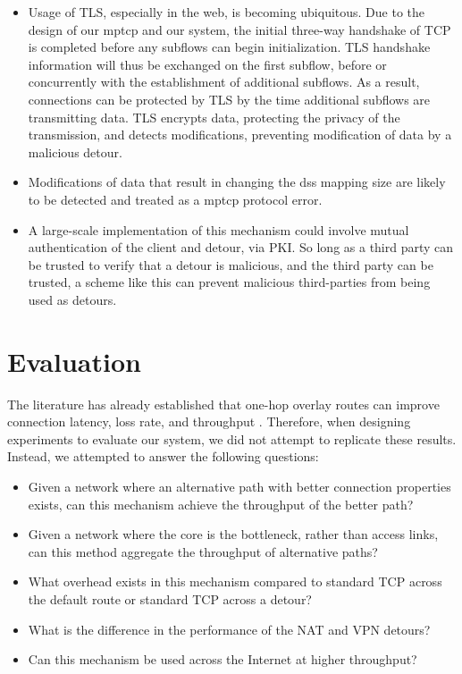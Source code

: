 \documentclass{cwru}
\begin{document}
\begin{itemize}
\item Usage of TLS, especially in the web, is becoming ubiquitous. Due to the
  design of our \ac{mptcp} and our system, the initial three-way handshake of
  TCP is completed before any subflows can begin initialization. TLS handshake
  information will thus be exchanged on the first subflow, before or
  concurrently with the establishment of additional subflows. As a result,
  connections can be protected by TLS by the time additional subflows are
  transmitting data. TLS encrypts data, protecting the privacy of the
  transmission, and detects modifications, preventing modification of data by a
  malicious detour.
\item Modifications of data that result in changing the \ac{dss} mapping size
  are likely to be detected and treated as a \ac{mptcp} protocol error.
\item A large-scale implementation of this mechanism could involve mutual
  authentication of the client and detour, via PKI. So long as a third party can
  be trusted to verify that a detour is malicious, and the third party can be
  trusted, a scheme like this can prevent malicious third-parties from being
  used as detours.
\end{itemize}

\chapter{Evaluation}
\label{c:eval}

The literature has already established that one-hop overlay routes can improve
connection latency, loss rate, and throughput
\cite{detour,ron,gummadi2004improving}. Therefore, when designing experiments to
evaluate our system, we did not attempt to replicate these results. Instead, we
attempted to answer the following questions:

\begin{itemize}
\item Given a network where an alternative path with better connection
  properties exists, can this mechanism achieve the throughput of the better
  path?
\item Given a network where the core is the bottleneck, rather than access
  links, can this method aggregate the throughput of alternative paths?
\item What overhead exists in this mechanism compared to standard TCP across the
  default route or standard TCP across a detour?
\item What is the difference in the performance of the NAT and VPN detours?
\item Can this mechanism be used across the Internet at higher throughput?
\end{itemize}
\end{document}
